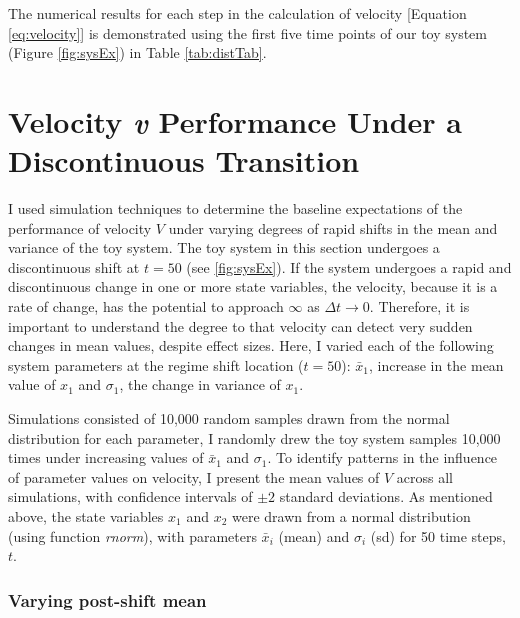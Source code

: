 \documentclass[print]{nuthesis}
\begin{document}
The numerical results for each step in the calculation of velocity {[}Equation \eqref{eq:velocity}{]} is demonstrated using the first five time points of our toy system (Figure \ref{fig:sysEx}) in Table \ref{tab:distTab}.

\hypertarget{velocity-v-performance-under-a-discontinuous-transition}{%
\section{\texorpdfstring{Velocity \emph{v} Performance Under a Discontinuous Transition}{Velocity v Performance Under a Discontinuous Transition}}\label{velocity-v-performance-under-a-discontinuous-transition}}

I used simulation techniques to determine the baseline expectations of the performance of velocity \(V\) under varying degrees of rapid shifts in the mean and variance of the toy system. The toy system in this section undergoes a discontinuous shift at \(t = 50\) (see \ref{fig:sysEx}). If the system undergoes a rapid and discontinuous change in one or more state variables, the velocity, because it is a rate of change, has the potential to approach \(\infty\) as \(\Delta t \rightarrow 0\). Therefore, it is important to understand the degree to that velocity can detect very sudden changes in mean values, despite effect sizes. Here, I varied each of the following system parameters at the regime shift location (\(t=50\)): \(\bar{x}_1\), increase in the mean value of \(x_1\) and \(\sigma_1\), the change in variance of \(x_1\).

Simulations consisted of 10,000 random samples drawn from the normal distribution for each parameter, I randomly drew the toy system samples 10,000 times under increasing values of \(\bar{x}_1\) and \(\sigma_1\). To identify patterns in the influence of parameter values on velocity, I present the mean values of \(V\) across all simulations, with confidence intervals of \(\pm 2\) standard deviations. As mentioned above, the state variables \(x_1\) and \(x_2\) were drawn from a normal distribution (using function \emph{rnorm}), with parameters \(\bar{x}_i\) (mean) and \(\sigma_i\) (sd) for 50 time steps, \(t\).

\hypertarget{varying-post-shift-mean}{%
\subsubsection{Varying post-shift mean}\label{varying-post-shift-mean}}
\end{document}

